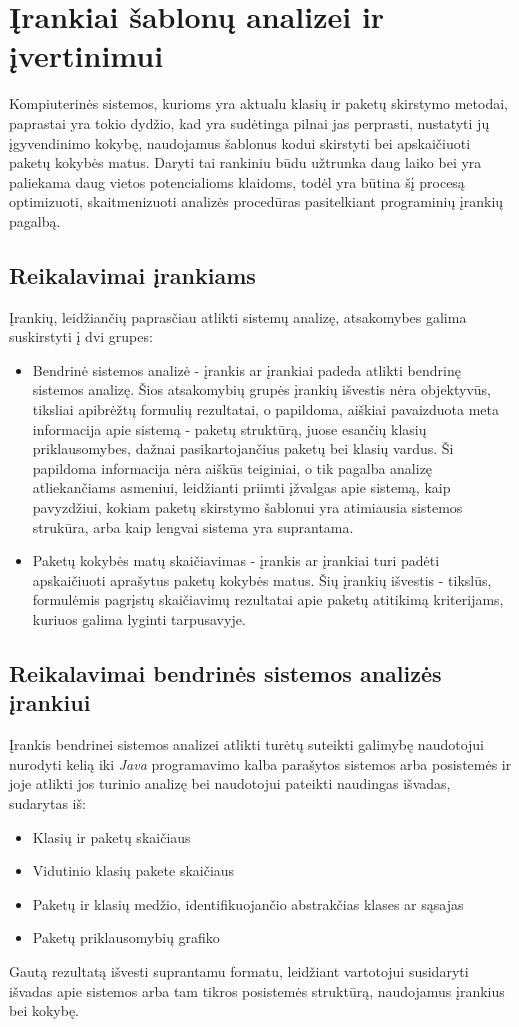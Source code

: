 \section{Įrankiai šablonų analizei ir įvertinimui}
Kompiuterinės sistemos, kurioms yra aktualu klasių ir paketų skirstymo metodai, paprastai yra tokio dydžio, kad
yra sudėtinga
pilnai jas perprasti, nustatyti jų įgyvendinimo kokybę, naudojamus šablonus kodui skirstyti bei
apskaičiuoti paketų kokybės matus.
Daryti tai rankiniu būdu užtrunka daug laiko bei yra paliekama daug vietos potencialioms klaidoms,
todėl yra būtina šį procesą optimizuoti, skaitmenizuoti analizės procedūras pasitelkiant
 programinių įrankių pagalbą.

\subsection{Reikalavimai įrankiams}
Įrankių, leidžiančių paprasčiau atlikti sistemų analizę, atsakomybes galima suskirstyti į dvi grupes:
\begin{itemize}
    \item Bendrinė sistemos analizė - įrankis ar įrankiai padeda atlikti bendrinę sistemos analizę.
    Šios atsakomybių grupės įrankių išvestis nėra objektyvūs, tiksliai apibrėžtų formulių rezultatai, o papildoma, aiškiai
    pavaizduota meta informacija apie sistemą - paketų struktūrą, juose esančių klasių priklausomybes, dažnai pasikartojančius paketų bei klasių vardus.
    Ši papildoma informacija nėra aiškūs teiginiai, o tik pagalba analizę atliekančiams asmeniui, leidžianti priimti įžvalgas apie sistemą,
    kaip pavyzdžiui, kokiam paketų skirstymo šablonui yra atimiausia sistemos strukūra, arba kaip lengvai sistema yra suprantama.
    \item Paketų kokybės matų skaičiavimas - įrankis ar įrankiai turi padėti apskaičiuoti aprašytus paketų kokybės matus.
    Šių įrankių išvestis - tikslūs, formulėmis pagrįstų skaičiavimų rezultatai apie paketų atitikimą kriterijams, kuriuos galima lyginti tarpusavyje.
\end{itemize}

\subsection{Reikalavimai bendrinės sistemos analizės įrankiui}
Įrankis bendrinei sistemos analizei atlikti turėtų suteikti galimybę naudotojui nurodyti kelią iki \textit{Java} programavimo kalba parašytos sistemos arba posistemės ir joje
atlikti jos turinio analizę bei naudotojui pateikti naudingas išvadas, sudarytas iš:
\begin{itemize}
    \item Klasių ir paketų skaičiaus
    \item Vidutinio klasių pakete skaičiaus
    \item Paketų ir klasių medžio, identifikuojančio abstrakčias klases ar sąsajas
    \item Paketų priklausomybių grafiko
\end{itemize}
Gautą rezultatą išvesti suprantamu formatu, leidžiant vartotojui susidaryti išvadas apie sistemos arba tam tikros
posistemės struktūrą, naudojamus įrankius bei kokybę.

